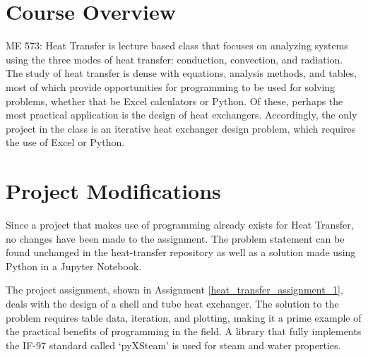 \section{Course Overview}

ME 573: Heat Transfer is lecture based class that focuses on analyzing systems using
the three modes of heat transfer: conduction, convection, and radiation. The study of
heat transfer is dense with equations, analysis methods, and tables, most of which
provide opportunities for programming to be used for solving problems, whether that
be Excel calculators or Python. Of these, perhaps the most practical application 
is the design of heat exchangers. Accordingly, the only project in the class is an 
iterative heat exchanger design problem, which requires the use of Excel or Python.

\section{Project Modifications}

Since a project that makes use of programming already exists for Heat Transfer, no
changes have been made to the assignment. The problem statement can be found unchanged
in the heat-transfer repository as well as a solution made using Python in a Jupyter
Notebook.

The project assignment, shown in Assignment \ref{heat_transfer_assignment_1}, deals 
with the design of a shell and tube heat exchanger. The solution to the problem requires
table data, iteration, and plotting, making it a prime example of the practical benefits
of programming in the field. A library that fully implements the IF-97 standard called
`pyXSteam' is used for steam and water properties.

\label{heat_transfer_assignment_1}

